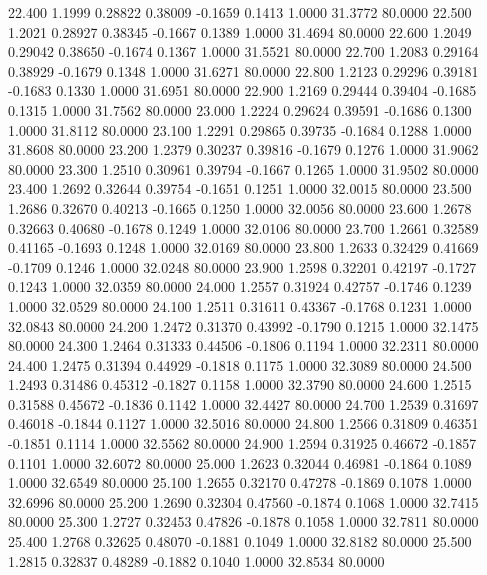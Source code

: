   22.400   1.1999   0.28822   0.38009  -0.1659   0.1413   1.0000  31.3772  80.0000
  22.500   1.2021   0.28927   0.38345  -0.1667   0.1389   1.0000  31.4694  80.0000
  22.600   1.2049   0.29042   0.38650  -0.1674   0.1367   1.0000  31.5521  80.0000
  22.700   1.2083   0.29164   0.38929  -0.1679   0.1348   1.0000  31.6271  80.0000
  22.800   1.2123   0.29296   0.39181  -0.1683   0.1330   1.0000  31.6951  80.0000
  22.900   1.2169   0.29444   0.39404  -0.1685   0.1315   1.0000  31.7562  80.0000
  23.000   1.2224   0.29624   0.39591  -0.1686   0.1300   1.0000  31.8112  80.0000
  23.100   1.2291   0.29865   0.39735  -0.1684   0.1288   1.0000  31.8608  80.0000
  23.200   1.2379   0.30237   0.39816  -0.1679   0.1276   1.0000  31.9062  80.0000
  23.300   1.2510   0.30961   0.39794  -0.1667   0.1265   1.0000  31.9502  80.0000
  23.400   1.2692   0.32644   0.39754  -0.1651   0.1251   1.0000  32.0015  80.0000
  23.500   1.2686   0.32670   0.40213  -0.1665   0.1250   1.0000  32.0056  80.0000
  23.600   1.2678   0.32663   0.40680  -0.1678   0.1249   1.0000  32.0106  80.0000
  23.700   1.2661   0.32589   0.41165  -0.1693   0.1248   1.0000  32.0169  80.0000
  23.800   1.2633   0.32429   0.41669  -0.1709   0.1246   1.0000  32.0248  80.0000
  23.900   1.2598   0.32201   0.42197  -0.1727   0.1243   1.0000  32.0359  80.0000
  24.000   1.2557   0.31924   0.42757  -0.1746   0.1239   1.0000  32.0529  80.0000
  24.100   1.2511   0.31611   0.43367  -0.1768   0.1231   1.0000  32.0843  80.0000
  24.200   1.2472   0.31370   0.43992  -0.1790   0.1215   1.0000  32.1475  80.0000
  24.300   1.2464   0.31333   0.44506  -0.1806   0.1194   1.0000  32.2311  80.0000
  24.400   1.2475   0.31394   0.44929  -0.1818   0.1175   1.0000  32.3089  80.0000
  24.500   1.2493   0.31486   0.45312  -0.1827   0.1158   1.0000  32.3790  80.0000
  24.600   1.2515   0.31588   0.45672  -0.1836   0.1142   1.0000  32.4427  80.0000
  24.700   1.2539   0.31697   0.46018  -0.1844   0.1127   1.0000  32.5016  80.0000
  24.800   1.2566   0.31809   0.46351  -0.1851   0.1114   1.0000  32.5562  80.0000
  24.900   1.2594   0.31925   0.46672  -0.1857   0.1101   1.0000  32.6072  80.0000
  25.000   1.2623   0.32044   0.46981  -0.1864   0.1089   1.0000  32.6549  80.0000
  25.100   1.2655   0.32170   0.47278  -0.1869   0.1078   1.0000  32.6996  80.0000
  25.200   1.2690   0.32304   0.47560  -0.1874   0.1068   1.0000  32.7415  80.0000
  25.300   1.2727   0.32453   0.47826  -0.1878   0.1058   1.0000  32.7811  80.0000
  25.400   1.2768   0.32625   0.48070  -0.1881   0.1049   1.0000  32.8182  80.0000
  25.500   1.2815   0.32837   0.48289  -0.1882   0.1040   1.0000  32.8534  80.0000
